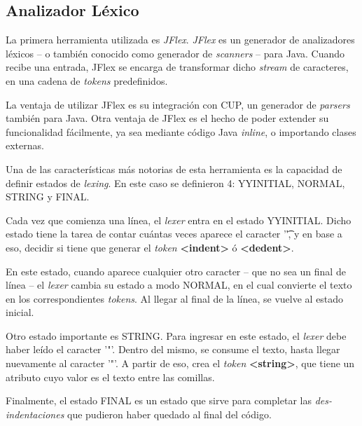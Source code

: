 \documentclass{article}
\begin{document}
        \subsection{Analizador Léxico}
            \par La primera herramienta utilizada es \textit{JFlex}. \textit{JFlex} es un generador de analizadores léxicos – o también conocido como generador de \textit{scanners} – para Java. Cuando recibe una entrada, JFlex se encarga de transformar dicho \textit{stream} de caracteres, en una cadena de \textit{tokens} predefinidos.
            \par La ventaja de utilizar JFlex es su integración con CUP, un generador de \textit{parsers} también para Java. Otra ventaja de JFlex es el hecho de poder extender su funcionalidad fácilmente, ya sea mediante código Java \textit{inline}, o importando clases externas.
            \\
            \par Una de las características más notorias de esta herramienta es la capacidad de definir estados de \textit{lexing}. En este caso se definieron 4: YYINITIAL, NORMAL, STRING y FINAL.
            \par Cada vez que comienza una línea, el \textit{lexer} entra en el estado YYINITIAL. Dicho estado tiene la tarea de contar cuántas veces aparece el caracter '\t', y en base a eso, decidir si tiene que generar el \textit{token} \textbf{<indent>} ó \textbf{<dedent>}.
            \par En este estado, cuando aparece cualquier otro caracter – que no sea un final de línea – el \textit{lexer} cambia su estado a modo NORMAL, en el cual convierte el texto en los correspondientes \textit{tokens}. Al llegar al final de la línea, se vuelve al estado inicial.
            \par Otro estado importante es STRING. Para ingresar en este estado, el \textit{lexer} debe haber leído el caracter '"'. Dentro del mismo, se consume el texto, hasta llegar nuevamente al caracter '"'. A partir de eso, crea el \textit{token} \textbf{<string>}, que tiene un atributo cuyo valor es el texto entre las comillas.
            \par Finalmente, el estado FINAL es un estado que sirve para completar las \textit{des-indentaciones} que pudieron haber quedado al final del código.
\end{document}
